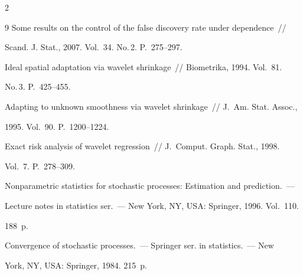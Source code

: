\begin{multicols}{2}
{{\begin{thebibliography}{9}
Some results on the control of the false discovery rate under dependence~// 

Scand. J. Stat., 2007. Vol.~34. No.\,2. P.~275--297.





Ideal spatial adaptation via wavelet shrinkage~// Biometrika, 1994. Vol.~81. 

No.\,3. P.~425--455.





Adapting to unknown smoothness via wavelet shrinkage~// J.~Am. Stat. Assoc., 

1995. Vol.~90. P.~1200--1224.





Exact risk analysis of wavelet regression~// J.~Comput. Graph. Stat., 1998. 

Vol.~7. P.~278--309.





Nonparametric statistics for stochastic processes: Estimation and prediction.~--- 

Lecture notes in statistics ser.~--- New York, NY, USA: Springer, 1996. Vol.~110. 

188~p.





Convergence of stochastic processes.~--- Springer ser. in statistics.~--- New 

York, NY, USA: Springer, 1984. 215~p.

\end{thebibliography}



 }

 }



\end{multicols}



\vspace*{-6pt}



